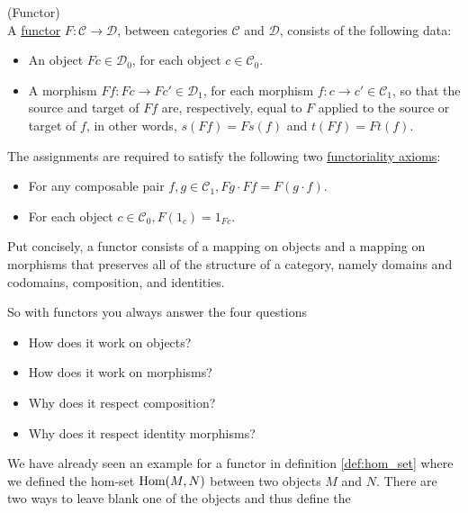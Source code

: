 \begin{definition}{(Functor)}\label{def:functor}\\
\noindent A \ul{functor} $F : \mathcal{C} \rightarrow \mathcal{D}$, between categories $\mathcal{C}$ and $\mathcal{D}$, consists of the
following data:

\begin{itemize}
\item An object $Fc\in\mathcal{D}_{0}$, for each object $c \in \mathcal{C}_{0}$.
\item A morphism $Ff : Fc \rightarrow Fc' \in \mathcal{D}_{1}$, for each morphism $f : c \rightarrow c' \in \mathcal{C}_{1}$, so that the
source and target of $Ff$ are, respectively, equal to $F$ applied to the source or target of $f$, in other words,
$s(Ff) = Fs(f)$ and $t(Ff) = Ft(f)$.
\end{itemize}

\noindent The assignments are required to satisfy the following two \ul{functoriality axioms}:
\begin{itemize}\label{functoriality}
\item For any composable pair $f, g \in \mathcal{C}_{1}, Fg \cdot Ff = F(g \cdot f)$.
\item For each object $c \in \mathcal{C}_{0}, F(1_{c}) = 1_{Fc}$.
\end{itemize}

Put concisely, a functor consists of a mapping on objects and a mapping on morphisms that preserves all of the structure of a category,
namely domains and codomains, composition, and identities.
\end{definition}

\noindent So with functors you always answer the four questions
\begin{itemize}\label{four_functor_questions}
\item How does it work on objects?
\item How does it work on morphisms?
\item Why does it respect composition?
\item Why does it respect identity morphisms?
\end{itemize}

We have already seen an example for a functor in definition \ref{def:hom_set} where we defined the hom-set $\textup{Hom}(M,N)$ between two
objects $M$ and $N$. There are two ways to leave blank one of the objects and thus define the 

